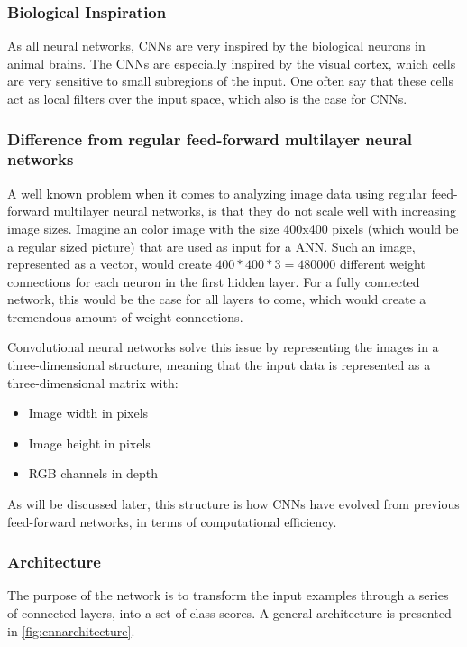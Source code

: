 \subsubsection{Biological Inspiration}
As all neural networks, CNNs are very inspired by the biological neurons in animal brains. The CNNs are especially inspired by the visual cortex, which cells are very sensitive to small subregions of the input. One often say that these cells act as local filters over the input space, which also is the case for CNNs.

\subsubsection{Difference from regular feed-forward multilayer neural networks}
A well known problem when it comes to analyzing image data using regular feed-forward multilayer neural networks, is that they do not scale well with increasing image sizes. Imagine an color image with the size 400x400 pixels (which would be a regular sized picture) that are used as input for a ANN. Such an image, represented as a vector, would create $400*400*3=480 000$ different weight connections for each neuron in the first hidden layer. For a fully connected network, this would be the case for all layers to come, which would create a tremendous amount of weight connections.

Convolutional neural networks solve this issue by representing the images in a three-dimensional structure, meaning that the input data is represented as a three-dimensional matrix with:

\begin{itemize}
	\item Image width in pixels
	\item Image height in pixels
	\item RGB channels in depth
\end{itemize}

As will be discussed later, this structure is how CNNs have evolved from previous feed-forward networks, in terms of computational efficiency.

\subsubsection{Architecture}
The purpose of the network is to transform the input examples through a series of connected layers, into a set of class scores. A general architecture is presented in \autoref{fig:cnnarchitecture}.

